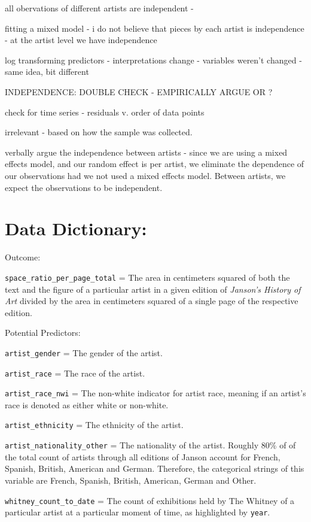 \documentclass[
  letterpaper,
  DIV=11,
  numbers=noendperiod]{scrreprt}
\begin{document}
all obervations of different artists are independent -

fitting a mixed model - i do not believe that pieces by each artist is
independence - at the artist level we have independence

log transforming predictors - interpretations change - variables weren't
changed - same idea, bit different

INDEPENDENCE: DOUBLE CHECK - EMPIRICALLY ARGUE OR ?

check for time series - residuals v. order of data points

irrelevant - based on how the sample was collected.

verbally argue the independence between artists - since we are using a
mixed effects model, and our random effect is per artist, we eliminate
the dependence of our observations had we not used a mixed effects
model. Between artists, we expect the observations to be independent.

\hypertarget{data-dictionary}{%
\section{\texorpdfstring{\textbf{Data
Dictionary:}}{Data Dictionary:}}\label{data-dictionary}}

Outcome:

\texttt{space\_ratio\_per\_page\_total} = The area in centimeters
squared of both the text and the figure of a particular artist in a
given edition of \emph{Janson's History of Art} divided by the area in
centimeters squared of a single page of the respective edition.

Potential Predictors:

\texttt{artist\_gender} = The gender of the artist.

\texttt{artist\_race} = The race of the artist.

\texttt{artist\_race\_nwi} = The non-white indicator for artist race,
meaning if an artist's race is denoted as either white or non-white.

\texttt{artist\_ethnicity} = The ethnicity of the artist.

\texttt{artist\_nationality\_other} = The nationality of the artist.
Roughly 80\% of of the total count of artists through all editions of
Janson account for French, Spanish, British, American and German.
Therefore, the categorical strings of this variable are French, Spanish,
British, American, German and Other.

\texttt{whitney\_count\_to\_date} = The count of exhibitions held by The
Whitney of a particular artist at a particular moment of time, as
highlighted by \texttt{year}.
\end{document}
